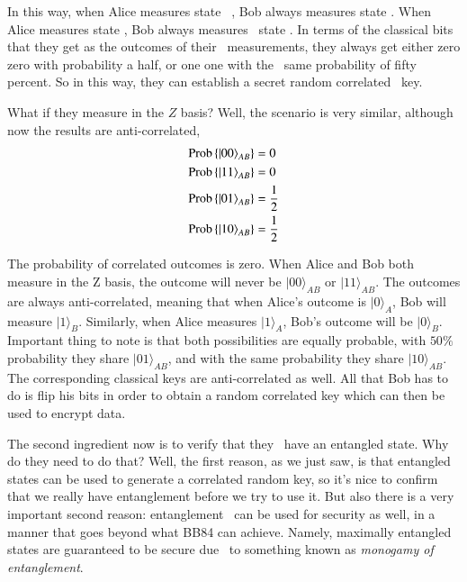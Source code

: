 In this way, when Alice measures state 
\ket{+}, Bob always measures state \ket{+}. When
Alice measures state \ket{-}, Bob always measures 
state \ket{-}. In terms of the classical bits
that they get as the outcomes of their 
measurements, they always get either zero
zero with probability a half, or one one with the 
same probability of fifty percent. So in this way,
they can establish a secret random correlated 
key.

What if they measure in the $Z$ basis? Well,
the scenario is very similar, although 
now the results are anti-correlated,
\begin{align}
\begin{aligned}
\operatorname{Prob}\left\{\left| 00 \right\rangle_{A B}\right\} &= 0 \\ 
\operatorname{Prob}\left\{\left| 11 \right\rangle_{A B}\right\} &= 0 \\
\operatorname{Prob}\left\{\left| 01 \right\rangle_{A B}\right\} &= \frac{1}{2} \\ 
\operatorname{Prob}\left\{\left| 10 \right\rangle_{A B}\right\} &= \frac{1}{2}
\end{aligned}
\end{align}

The probability of correlated outcomes is zero.
When Alice and Bob both measure in the Z basis, the outcome will never be $|00\rangle_{AB}$ or $|11\rangle_{AB}$.
The outcomes are always anti-correlated, meaning that when Alice's outcome is $|0\rangle_A$, Bob will measure $|1\rangle_B$.
Similarly, when Alice measures $|1\rangle_A$, Bob's outcome will be $|0\rangle_B$.
Important thing to note is that both possibilities are equally probable, with $50\%$ probability they share $|01\rangle_{AB}$, and with the same probability they share $|10\rangle_{AB}$.
The corresponding classical keys are anti-correlated as well.
All that Bob has to do is flip his bits in order to obtain a random correlated key which can then be used to encrypt data.

The second ingredient now is to verify that they 
have an entangled state. Why do they need to do
that? Well, the first reason, as we just saw, is
that entangled states can be used to generate a
correlated random key, so it's nice to confirm that we really have entanglement before we try to use it. But also there is a very 
important second reason: entanglement 
can be used for security as well, in a manner that goes beyond what BB84 can achieve. Namely, maximally
entangled states are guaranteed to be secure due 
to something known as \emph{monogamy of entanglement}.

